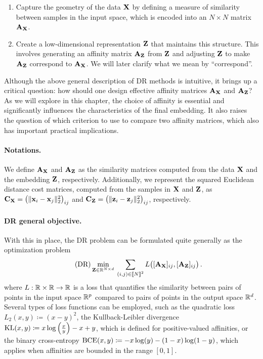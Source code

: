\begin{enumerate}
    \item Capture the geometry of the data ${\mathbf{X}}$ by defining a measure of similarity between samples in the input space, which is encoded into an $N \times N$ matrix ${\mathbf{A}}_{{\mathbf{X}}}$.
    \item Create a low-dimensional representation ${\mathbf{Z}}$ that maintains this structure. This involves generating an affinity matrix ${\mathbf{A}}_{{\mathbf{Z}}}$ from ${\mathbf{Z}}$ and adjusting ${\mathbf{Z}}$ to make ${\mathbf{A}}_{{\mathbf{Z}}}$ correspond to ${\mathbf{A}}_{{\mathbf{X}}}$. We will later clarify what we mean by ``correspond''.
\end{enumerate}

Although the above general description of DR methods is intuitive, it brings up a critical question: how should one design effective affinity matrices ${\mathbf{A}}_{{\mathbf{X}}}$ and ${\mathbf{A}}_{{\mathbf{Z}}}$? As we will explore in this chapter, the choice of affinity is essential and significantly influences the characteristics of the final embedding. It also raises the question of which criterion to use to compare two affinity matrices, which also has important practical implications.

\paragraph{Notations.} 
We define ${\mathbf{A}}_{\mathbf{X}}$ and ${\mathbf{A}}_{\mathbf{Z}}$ as the similarity matrices computed from the data ${\mathbf{X}}$ and the embedding ${\mathbf{Z}}$, respectively. Additionally, we represent the squared Euclidean distance cost matrices, computed from the samples in ${\mathbf{X}}$ and ${\mathbf{Z}}$, as $\mathbf{C}_{\mathbf{X}} = \left(\|{\mathbf{x}}_{i}-{\mathbf{x}}_{j}\|_2^2\right)_{ij}$ and $\mathbf{C}_{\mathbf{Z}} = \left(\|{\mathbf{z}}_{i}-{\mathbf{z}}_{j}\|_2^2\right)_{ij}$, respectively.

\paragraph{DR general objective.} With this in place, the DR problem can be formulated quite generally as the optimization problem
\begin{equation}
\label{eq:DR_criterion}\tag{DR}
\min_{{\mathbf{Z}} \in \mathbb{R}^{N \times d}} \: \sum_{(i,j) \in {[\![N]\!]}^2}  L\big([{\mathbf{A}}_{\mathbf{X}}]_{ij}, [{\mathbf{A}}_{\mathbf{Z}}]_{ij}\big) \,.
\end{equation}
where $L:\mathbb{R} \times \mathbb{R} \rightarrow \mathbb{R}$ is a loss that quantifies the similarity between pairs of points in the input space $\mathbb{R}^{p}$ compared to pairs of points in the output space $\mathbb{R}^{d}$. Several types of loss functions can be employed, such as the quadratic loss $L_2(x, y) \coloneqq (x - y)^2$, the Kullback-Leibler divergence $\operatorname{KL}(x, y) \coloneqq x \log \left(\frac{x}{y}\right) - x + y$, which is defined for positive-valued affinities, or the binary cross-entropy $\operatorname{BCE}(x, y) \coloneqq -x \log(y) - (1 - x) \log(1 - y)$, which applies when affinities are bounded in the range $[0,1]$.


